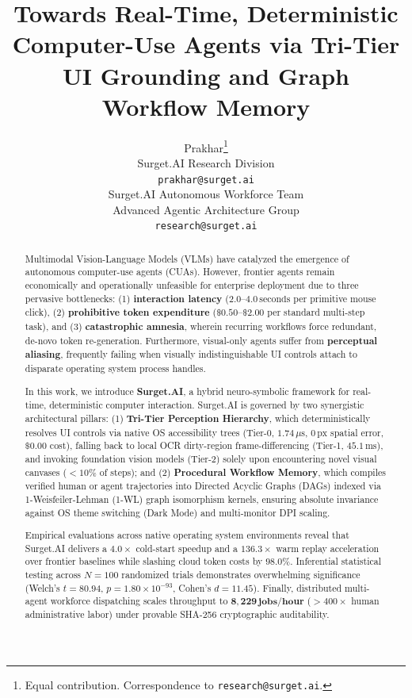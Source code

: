 \documentclass[10pt]{article}
\title{Towards Real-Time, Deterministic Computer-Use Agents via Tri-Tier UI Grounding and Graph Workflow Memory}
\author{%
  Prakhar\thanks{Equal contribution. Correspondence to \texttt{research@surget.ai}.} \\
  Surget.AI Research Division \\
  \texttt{prakhar@surget.ai} \\
  \And
  Surget.AI Autonomous Workforce Team \\
  Advanced Agentic Architecture Group \\
  \texttt{research@surget.ai} \\
}
\begin{document}
\maketitle

\begin{abstract}
Multimodal Vision-Language Models (VLMs) have catalyzed the emergence of autonomous computer-use agents (CUAs). However, frontier agents remain economically and operationally unfeasible for enterprise deployment due to three pervasive bottlenecks: (1) \textbf{interaction latency} ($2.0\text{--}4.0\,\text{seconds}$ per primitive mouse click), (2) \textbf{prohibitive token expenditure} ($\$0.50\text{--}\$2.00$ per standard multi-step task), and (3) \textbf{catastrophic amnesia}, wherein recurring workflows force redundant, de-novo token re-generation. Furthermore, visual-only agents suffer from \textbf{perceptual aliasing}, frequently failing when visually indistinguishable UI controls attach to disparate operating system process handles.

In this work, we introduce \textbf{Surget.AI}, a hybrid neuro-symbolic framework for real-time, deterministic computer interaction. Surget.AI is governed by two synergistic architectural pillars: (1) \textbf{Tri-Tier Perception Hierarchy}, which deterministically resolves UI controls via native OS accessibility trees (Tier-0, $1.74\,\mu\text{s}$, $0\,\text{px}$ spatial error, $\$0.00$ cost), falling back to local OCR dirty-region frame-differencing (Tier-1, $45.1\,\text{ms}$), and invoking foundation vision models (Tier-2) solely upon encountering novel visual canvases ($<10\%$ of steps); and (2) \textbf{Procedural Workflow Memory}, which compiles verified human or agent trajectories into Directed Acyclic Graphs (DAGs) indexed via 1-Weisfeiler-Lehman (1-WL) graph isomorphism kernels, ensuring absolute invariance against OS theme switching (Dark Mode) and multi-monitor DPI scaling.

Empirical evaluations across native operating system environments reveal that Surget.AI delivers a $\mathbf{4.0\times}$ cold-start speedup and a $\mathbf{136.3\times}$ warm replay acceleration over frontier baselines while slashing cloud token costs by $\mathbf{98.0\%}$. Inferential statistical testing across $N=100$ randomized trials demonstrates overwhelming significance (Welch's $t = 80.94$, $p = 1.80 \times 10^{-93}$, Cohen's $d = 11.45$). Finally, distributed multi-agent workforce dispatching scales throughput to $\mathbf{8,229\,\text{jobs/hour}}$ ($>400\times$ human administrative labor) under provable SHA-256 cryptographic auditability.
\end{abstract}
\end{document}
